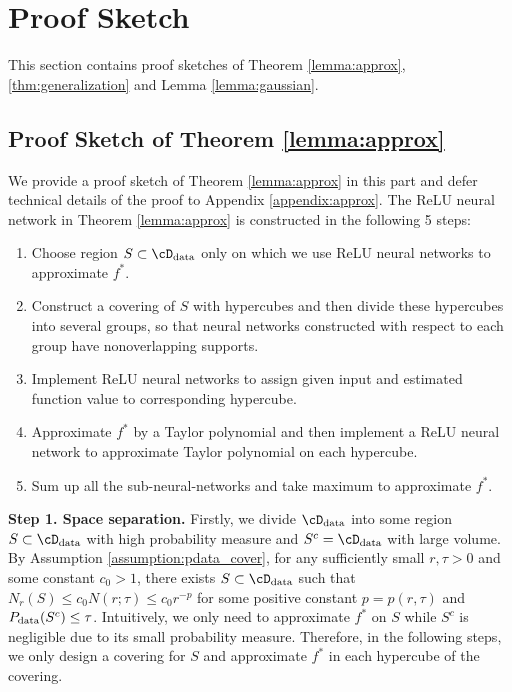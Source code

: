 \section{Proof Sketch}

This section contains proof sketches of Theorem \ref{lemma:approx}, \ref{thm:generalization} and Lemma \ref{lemma:gaussian}. 

\subsection{Proof Sketch of Theorem \ref{lemma:approx}}\label{sec:proof-sketch-approx}

We provide a proof sketch of Theorem \ref{lemma:approx} in this part and defer technical details of the proof to Appendix \ref{appendix:approx}.
The ReLU neural network in Theorem \ref{lemma:approx} is constructed in the following 5 steps:
\begin{enumerate}%
    \item Choose region $S \subset \cD_{\rm data}$ only on which we use ReLU neural networks to approximate $f^*$.
    \item Construct a covering of $S$ with hypercubes and then divide these hypercubes into several groups, so that neural networks constructed with respect to each group have nonoverlapping supports.
    \item Implement ReLU neural networks to assign given input and estimated function value to corresponding hypercube.
    \item Approximate $f^*$ by a Taylor polynomial and then implement a ReLU neural network to approximate Taylor polynomial on each hypercube.
    \item Sum up all the sub-neural-networks and take maximum to approximate $f^*$.
\end{enumerate}

\textbf{Step 1. Space separation.} Firstly, we divide $\cD_{\rm data}$ into some region $S \subset \cD_{\rm data}$ with high probability measure and $S^c = \cD_{\rm data} $ with large volume. By Assumption \ref{assumption:pdata_cover}, for any sufficiently small $r,\tau>0$ and some constant $c_0>1$, there exists $S \subset \cD_{\rm data}$ such that $N_r(S) \leq c_0 N(r;\tau) \leq c_0 r^{-p}$ for some positive constant $p=p(r,\tau)$ and $P_{\rm data}(S^c) \leq \tau$. Intuitively, we only need to approximate $f^*$ on $S$ while $S^c$ is negligible due to its small probability measure.  Therefore, in the following steps, we only design a covering for $S$ and approximate $f^*$ in each hypercube of the covering. 

